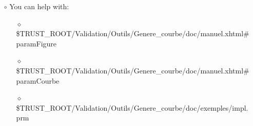 \documentclass[10pt, hyperref={unicode=true,pdfusetitle, bookmarks=true,bookmarksnumbered=false,bookmarksopen=false, breaklinks=false,pdfborder={0 0 1},backref=true,colorlinks=true,linkcolor=darkblue,pageanchor}]{beamer}
\begin{document}
\begin{frame}
\begin{block}{}
\begin{itemize}
\begin{itemize}
{{    \hspace{0.6cm} \textbf{\}}  \\
    \hspace{0.6cm} \textbf{...}  \\
    \hspace{.3cm} \textbf{\}}  \\
    }}
    \item [$\circ$] You can help with:
        \begin{itemize}
        \item [$\diamond$] {\scriptsize{\$TRUST\_ROOT/Validation/Outils/Genere\_courbe/doc/manuel.xhtml\#paramFigure}}
        \item [$\diamond$] {\scriptsize{\$TRUST\_ROOT/Validation/Outils/Genere\_courbe/doc/manuel.xhtml\#paramCourbe}}
        \item [$\diamond$] {\scriptsize{\$TRUST\_ROOT/Validation/Outils/Genere\_courbe/doc/exemples/impl.prm}}
        \end{itemize}
    \end{itemize}
\end{itemize}

\end{block}
\end{frame}
\end{document}
